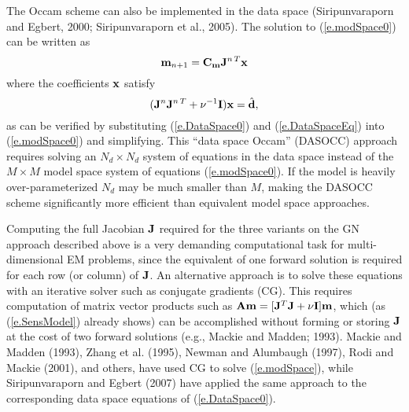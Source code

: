 The Occam scheme can also be implemented in the data space 
(Siripunvaraporn and Egbert, 2000;
Siripunvaraporn et al., 2005).  The solution to
(\ref{e.modSpace0}) can be written as
\begin{equation}
\label{e.DataSpace0}
{\bf m}_{n+1} = {\bf C_m} {\bf J}^{n\,T} {\bf x}
\end{equation}
where the coefficients ${\bf x}$ satisfy 
\begin{equation}
\label{e.DataSpaceEq}
( {\bf J}^n {\bf J}^{n\,T} + \nu^{-1} {\bf I} ) {\bf x} =  \hat{\bf d} ,
\end{equation}
as can be verified by substituting
(\ref{e.DataSpace0}) and (\ref{e.DataSpaceEq}) into (\ref{e.modSpace0})
and simplifying.
This ``data space Occam'' (DASOCC) approach requires
solving an $N_d \times N_d$ system of equations in the data space
instead of the $M \times M$ model space system of equations (\ref{e.modSpace0}).
If the model is heavily over-parameterized 
$N_d$ may be much smaller than $M$, making the
DASOCC scheme significantly more efficient than equivalent model 
space approaches.  

Computing the full Jacobian ${\bf J}$ required
for the three variants on the GN approach described above
is a very demanding computational task
for multi-dimensional EM problems, since the equivalent
of one forward solution is required for each row (or column) of ${\bf J}$.
An alternative approach is to solve these equations with
an iterative solver such as conjugate gradients (CG).  This
requires computation of matrix vector products
such as ${\bf A} {\bf m} = [ {\bf J}^T {\bf J} + \nu {\bf I}] {\bf m}$, which
(as (\ref{e.SensModel}) already shows)
can be accomplished without forming
or storing ${\bf J}$ at the cost of two forward solutions
(e.g., Mackie and Madden; 1993).
Mackie and Madden (1993),
Zhang et al. (1995), Newman and Alumbaugh (1997),
Rodi and Mackie (2001), and others, have used
CG to solve (\ref{e.modSpace}),
while Siripunvaraporn and Egbert (2007) have applied the same approach
to the corresponding data space equations of (\ref{e.DataSpace0}).

